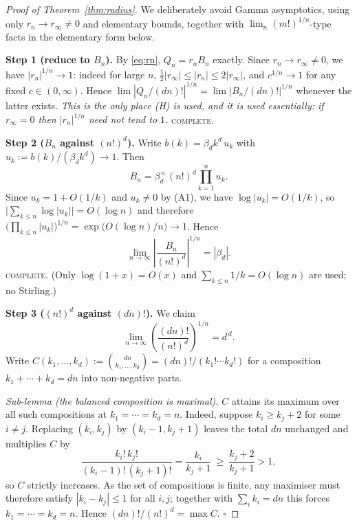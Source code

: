 \documentclass[11pt]{article}
\theoremstyle{definition}
\newcommand{\bd}{\beta_d}
\newcommand{\rinf}{r_\infty}
\begin{document}
\begin{proof}[Proof of Theorem~\ref{thm:radius}]
We deliberately avoid Gamma asymptotics, using only $r_n\to\rinf\neq0$ and
elementary bounds, together with $\lim_{n}(m!)^{1/n}$-type facts in the
elementary form below.

\medskip\noindent\textbf{Step 1 (reduce to $B_n$).}
By \eqref{eq:rn}, $Q_n=r_nB_n$ exactly. Since $r_n\to\rinf\neq0$, we have
$|r_n|^{1/n}\to1$: indeed for large $n$, $\tfrac12|\rinf|\le|r_n|\le2|\rinf|$,
and $c^{1/n}\to1$ for any fixed $c\in(0,\infty)$. Hence
$\lim|Q_n/(dn)!|^{1/n}=\lim|B_n/(dn)!|^{1/n}$ whenever the latter exists.
\emph{This is the only place (H) is used, and it is used essentially: if
$\rinf=0$ then $|r_n|^{1/n}$ need not tend to $1$.} \textsc{complete.}

\medskip\noindent\textbf{Step 2 ($B_n$ against $(n!)^d$).}
Write $b(k)=\bd k^d\,u_k$ with $u_k:=b(k)/(\bd k^d)\to1$. Then
\[
B_n=\bd^{\,n}\,(n!)^{d}\prod_{k=1}^{n}u_k .
\]
Since $u_k=1+O(1/k)$ and $u_k\neq0$ by (A1), we have $\log|u_k|=O(1/k)$, so
$\bigl|\sum_{k\le n}\log|u_k|\bigr|=O(\log n)$ and therefore
$\bigl(\prod_{k\le n}|u_k|\bigr)^{1/n}=\exp\bigl(O(\log n)/n\bigr)\to1$.
Hence
\begin{equation}\label{eq:Bnroot}
\lim_{n\to\infty}\left|\frac{B_n}{(n!)^{d}}\right|^{1/n}=|\bd| .
\end{equation}
\textsc{complete.} (Only $\log(1+x)=O(x)$ and $\sum_{k\le n}1/k=O(\log n)$ are
used; no Stirling.)

\medskip\noindent\textbf{Step 3 ($(n!)^d$ against $(dn)!$).}
We claim
\begin{equation}\label{eq:multinomial}
\lim_{n\to\infty}\left(\frac{(dn)!}{(n!)^{d}}\right)^{1/n}=d^{\,d}.
\end{equation}
Write $C(k_1,\dots,k_d):=\binom{dn}{k_1,\dots,k_d}=(dn)!/(k_1!\cdots k_d!)$ for
a composition $k_1+\cdots+k_d=dn$ into non-negative parts.

\emph{Sub-lemma (the balanced composition is maximal).} $C$ attains its maximum
over all such compositions at $k_1=\cdots=k_d=n$. Indeed, suppose
$k_i\ge k_j+2$ for some $i\neq j$. Replacing $(k_i,k_j)$ by $(k_i-1,k_j+1)$
leaves the total $dn$ unchanged and multiplies $C$ by
\[
\frac{k_i!\,k_j!}{(k_i-1)!\,(k_j+1)!}=\frac{k_i}{k_j+1}\ \ge\ \frac{k_j+2}{k_j+1}>1 ,
\]
so $C$ strictly increases. As the set of compositions is finite, any maximiser
must therefore satisfy $|k_i-k_j|\le1$ for all $i,j$; together with
$\sum_ik_i=dn$ this forces $k_1=\cdots=k_d=n$. Hence
$(dn)!/(n!)^d=\max C$. \hfill$\square$


\end{proof}
\end{document}
